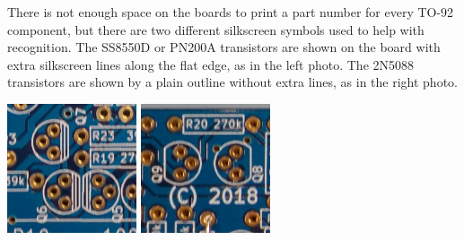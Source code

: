 There is not enough space on the boards to print a part number for every
TO-92 component, but there are two different silkscreen symbols used to help
with recognition.  The SS8550D or PN200A transistors are shown on the board
with extra silkscreen lines along the flat edge, as in the left photo.  The
2N5088 transistors are shown by a plain outline without extra lines, as in
the right photo.

\noindent\includegraphics[width={1.50in}]{to92-bar.jpg}\quad
\includegraphics[width={1.50in}]{to92-nobar.jpg}

